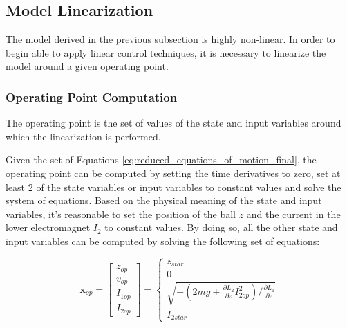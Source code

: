 \subsection{Model Linearization}
\label{subsec:model_linearization}

The model derived in the previous subsection is highly non-linear.
In order to begin able to apply linear control techniques, it is necessary to linearize the model around a given operating point.

\subsubsection{Operating Point Computation}
\label{subsubsec:operating_point_computation}

The operating point is the set of values of the state and input variables around which the linearization is performed.

Given the set of Equations \ref{eq:reduced_equations_of_motion_final}, the operating point can be computed by setting the time derivatives to zero, set at least 2 of the state variables or input variables to constant values and solve the system of equations.
Based on the physical meaning of the state and input variables, it's reasonable to set the position of the ball $z$ and the current in the lower electromagnet $I_2$ to constant values.
By doing so, all the other state and input variables can be computed by solving the following set of equations:

\begin{equation}
    \mathbf{x}_{op} =
    \begin{bmatrix}
        z_{op}  \\
        v_{op}  \\
        I_{1op} \\
        I_{2op}
    \end{bmatrix}
    =
    \begin{cases}
        z_{star}                                                                                       \\
        0                                                                                              \\
        \sqrt{ -(2m g + \frac{\partial L_2}{\partial z} I_{2op}^2) / \frac{\partial L_1}{\partial z} } \\
        I_{2star}
    \end{cases}
\end{equation}

